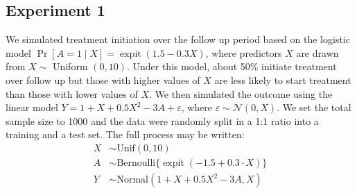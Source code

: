 \subsection{Experiment 1}
We simulated treatment initiation over the follow up period based on the logistic model $\Pr[A=1 \mid X]=\operatorname{expit} (1.5-0.3 X)$, where predictors $X$ are drawn from $X \sim$ Uniform $(0,10)$. Under this model, about 50\% initiate treatment over follow up but those with higher values of $X$ are less likely to start treatment than those with lower values of $X$. We then simulated the outcome using the linear model $Y=1+X+0.5 X^2- 3A + \varepsilon$, where $\varepsilon \sim \mathcal{N}(0, X)$.  We set the total sample size to 1000 and the data were randomly split in a 1:1 ratio into a training and a test set. The full process may be written:
\begin{align*}
    X & \sim \text{Unif}(0, 10) \\
    A & \sim \text{Bernoulli}\{\operatorname{expit}(-1.5 + 0.3 \cdot X)\} \\
    Y & \sim \text{Normal}(1 + X + 0.5 X^2 - 3 A, X)
\end{align*}    
 
